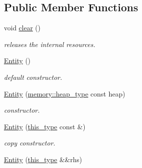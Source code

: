 \subsection*{Public Member Functions}
\begin{DoxyCompactItemize}
\item 
\hypertarget{classhryky_1_1http_1_1_entity_a406ce4d583802b9a66838047fbfd75bf}{void \hyperlink{classhryky_1_1http_1_1_entity_a406ce4d583802b9a66838047fbfd75bf}{clear} ()}\label{classhryky_1_1http_1_1_entity_a406ce4d583802b9a66838047fbfd75bf}

\begin{DoxyCompactList}\small\item\em releases the internal resources. \end{DoxyCompactList}\item 
\hypertarget{classhryky_1_1http_1_1_entity_add41c964efc3356d4606780b1533bc67}{\hyperlink{classhryky_1_1http_1_1_entity_add41c964efc3356d4606780b1533bc67}{Entity} ()}\label{classhryky_1_1http_1_1_entity_add41c964efc3356d4606780b1533bc67}

\begin{DoxyCompactList}\small\item\em default constructor. \end{DoxyCompactList}\item 
\hypertarget{classhryky_1_1http_1_1_entity_a2ad0bb60013b877665f8ff62aa8cd320}{\hyperlink{classhryky_1_1http_1_1_entity_a2ad0bb60013b877665f8ff62aa8cd320}{Entity} (\hyperlink{classhryky_1_1memory_1_1heap_1_1_base}{memory\-::heap\-\_\-type} const heap)}\label{classhryky_1_1http_1_1_entity_a2ad0bb60013b877665f8ff62aa8cd320}

\begin{DoxyCompactList}\small\item\em constructor. \end{DoxyCompactList}\item 
\hypertarget{classhryky_1_1http_1_1_entity_a533800e5db29dad6aa2c89fa37775bdb}{\hyperlink{classhryky_1_1http_1_1_entity_a533800e5db29dad6aa2c89fa37775bdb}{Entity} (\hyperlink{classhryky_1_1http_1_1_entity_a4afcdfef1cb6784f4dca15a9379e507f}{this\-\_\-type} const \&)}\label{classhryky_1_1http_1_1_entity_a533800e5db29dad6aa2c89fa37775bdb}

\begin{DoxyCompactList}\small\item\em copy constructor. \end{DoxyCompactList}\item 
\hypertarget{classhryky_1_1http_1_1_entity_a34dd2f6cf07902d6cce352de3103348f}{\hyperlink{classhryky_1_1http_1_1_entity_a34dd2f6cf07902d6cce352de3103348f}{Entity} (\hyperlink{classhryky_1_1http_1_1_entity_a4afcdfef1cb6784f4dca15a9379e507f}{this\-\_\-type} \&\&rhs)}\label{classhryky_1_1http_1_1_entity_a34dd2f6cf07902d6cce352de3103348f}


\end{DoxyCompactItemize}
